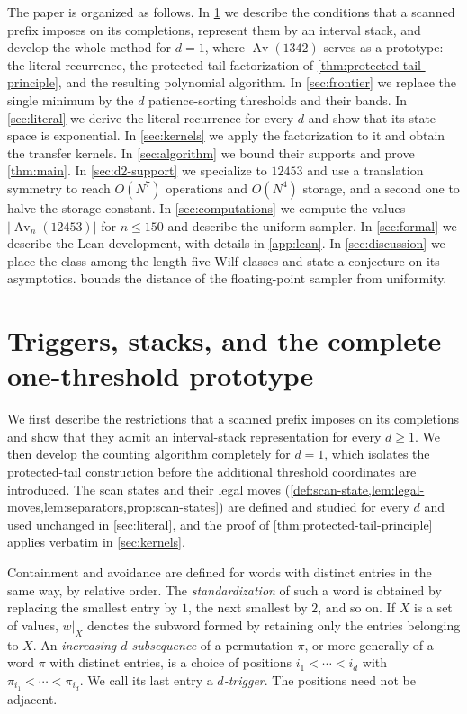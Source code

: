 \documentclass[11pt,reqno]{amsart}
\theoremstyle{definition}
\theoremstyle{remark}
\newcommand{\Av}{\operatorname{Av}}
\begin{document}
The paper is organized as follows.  In \cref{sec:obligations} we describe the
conditions that a scanned prefix imposes on its completions, represent them
by an interval stack, and develop the whole method for $d=1$, where
$\Av(1342)$ serves as a prototype: the literal recurrence, the protected-tail
factorization of \cref{thm:protected-tail-principle}, and the resulting
polynomial algorithm.  In \cref{sec:frontier} we replace the single minimum
by the $d$ patience-sorting thresholds and their bands.  In
\cref{sec:literal} we derive the literal recurrence for every $d$ and show
that its state space is exponential.  In \cref{sec:kernels} we apply the
factorization to it and obtain the transfer kernels.  In \cref{sec:algorithm}
we bound their supports and prove \cref{thm:main}.  In \cref{sec:d2-support}
we specialize to $12453$ and use a translation symmetry to reach $O(N^7)$
operations and $O(N^4)$ storage, and a second one to halve the storage
constant.  In \cref{sec:computations} we
compute the values $\lvert\Av_n(12453)\rvert$ for $n\leq150$ and describe the uniform
sampler.  In \cref{sec:formal} we describe the Lean development, with
details in \cref{app:lean}.  In \cref{sec:discussion} we place the class among the
length-five Wilf classes and state a conjecture on its asymptotics.
 bounds the distance of the floating-point sampler from
uniformity.

\section{Triggers, stacks, and the complete one-threshold prototype}
\label{sec:obligations}

We first describe the restrictions that a scanned prefix imposes on its
completions and show that they admit an interval-stack representation for
every $d\geq1$.  We then develop the counting algorithm completely for
$d=1$, which isolates the protected-tail construction before the additional
threshold coordinates are introduced.  The scan states and their legal
moves (\cref{def:scan-state,lem:legal-moves,lem:separators,prop:scan-states})
are defined and studied for every $d$ and used unchanged in
\cref{sec:literal}, and the proof of \cref{thm:protected-tail-principle}
applies verbatim in \cref{sec:kernels}.

Containment and avoidance are defined for words with distinct entries in
the same way, by relative order.  The \emph{standardization} of such a word is
obtained by replacing the smallest entry by $1$, the next smallest by $2$,
and so on.  If $X$ is a set of values, $w|_X$ denotes the
subword formed by retaining only the entries belonging to $X$.  An
\emph{increasing $d$-subsequence} of a permutation $\pi$, or more generally of a
word $\pi$ with distinct entries, is a choice of positions
$i_1<\cdots<i_d$ with
$\pi_{i_1}<\cdots<\pi_{i_d}$.  We call its last entry a
\emph{$d$-trigger}.  The positions need not be adjacent.
\end{document}
